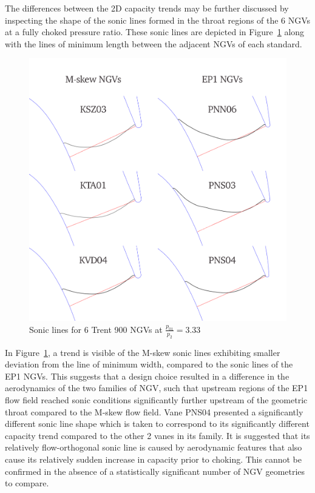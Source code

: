 \documentclass[a4paper, 11pt, oneside]{report}
\begin{document}
The differences between the 2D capacity trends may be further discussed by inspecting the shape of the sonic lines formed in the throat regions of the 6 NGVs at a fully choked pressure ratio. These sonic lines are depicted in Figure~\ref{fig:T900_mach1_lines} along with the lines of minimum length between the adjacent NGVs of each standard. 

\begin{figure}[H]
      \centering
      \includegraphics[width=.7\textwidth]{figs/T900_mach1_lines.png}
      \caption{Sonic lines for 6 Trent 900 NGVs at $\frac{p_{01}}{p_2}=3.33$}
      \label{fig:T900_mach1_lines}
\end{figure}

In Figure~\ref{fig:T900_mach1_lines}, a trend is visible of the M-skew sonic lines exhibiting smaller deviation from the line of minimum width, compared to the sonic lines of the EP1 NGVs. This suggests that a design choice resulted in a difference in the aerodynamics of the two families of NGV, such that upstream regions of the EP1 flow field reached sonic conditions significantly further upstream of the geometric throat compared to the M-skew flow field. Vane PNS04 presented a significantly different sonic line shape which is taken to correspond to its significantly different capacity trend compared to the other 2 vanes in its family. It is suggested that its relatively flow-orthogonal sonic line is caused by aerodynamic features that also cause its relatively sudden increase in capacity prior to choking. This cannot be confirmed in the absence of a statistically significant number of NGV geometries to compare.
\end{document}

